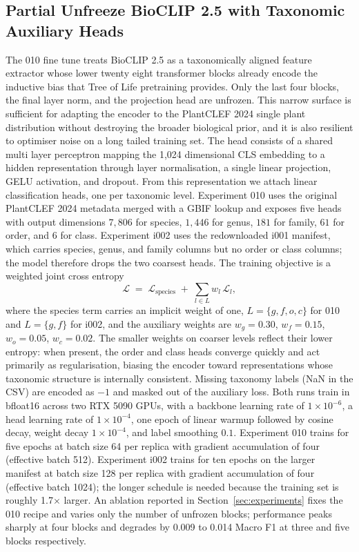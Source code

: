\documentclass[sigconf]{ceurart}
\begin{document}
\subsection{Partial Unfreeze BioCLIP 2.5 with Taxonomic Auxiliary Heads}
\label{sec:bioclip25_010}
The 010 fine tune treats BioCLIP 2.5 as a taxonomically aligned feature extractor whose lower twenty eight transformer blocks already encode the inductive bias that Tree of Life pretraining provides. Only the last four blocks, the final layer norm, and the projection head are unfrozen. This narrow surface is sufficient for adapting the encoder to the PlantCLEF 2024 single plant distribution without destroying the broader biological prior, and it is also resilient to optimiser noise on a long tailed training set.
The head consists of a shared multi layer perceptron mapping the 1,024 dimensional CLS embedding to a hidden representation through layer normalisation, a single linear projection, GELU activation, and dropout. From this representation we attach linear classification heads, one per taxonomic level. Experiment 010 uses the original PlantCLEF 2024 metadata merged with a GBIF lookup and exposes five heads with output dimensions $7{,}806$ for species, $1{,}446$ for genus, $181$ for family, $61$ for order, and $6$ for class. Experiment i002 uses the redownloaded i001 manifest, which carries species, genus, and family columns but no order or class columns; the model therefore drops the two coarsest heads. The training objective is a weighted joint cross entropy
\begin{equation}
\mathcal{L} \;=\; \mathcal{L}_{\text{species}} \;+\; \!\!\!\!\sum_{l \in L}\!\!\!\! w_l\,\mathcal{L}_l,
\end{equation}
where the species term carries an implicit weight of one, $L = \{g,f,o,c\}$ for 010 and $L = \{g,f\}$ for i002, and the auxiliary weights are $w_g{=}0.30$, $w_f{=}0.15$, $w_o{=}0.05$, $w_c{=}0.02$. The smaller weights on coarser levels reflect their lower entropy: when present, the order and class heads converge quickly and act primarily as regularisation, biasing the encoder toward representations whose taxonomic structure is internally consistent. Missing taxonomy labels (NaN in the CSV) are encoded as $-1$ and masked out of the auxiliary loss.
Both runs train in bfloat16 across two RTX 5090 GPUs, with a backbone learning rate of $1{\times}10^{-6}$, a head learning rate of $1{\times}10^{-4}$, one epoch of linear warmup followed by cosine decay, weight decay $1{\times}10^{-4}$, and label smoothing $0.1$. Experiment 010 trains for five epochs at batch size 64 per replica with gradient accumulation of four (effective batch 512). Experiment i002 trains for ten epochs on the larger manifest at batch size 128 per replica with gradient accumulation of four (effective batch 1024); the longer schedule is needed because the training set is roughly 1.7$\times$ larger. An ablation reported in Section~\ref{sec:experiments} fixes the 010 recipe and varies only the number of unfrozen blocks; performance peaks sharply at four blocks and degrades by 0.009 to 0.014 Macro F1 at three and five blocks respectively.
\end{document}
